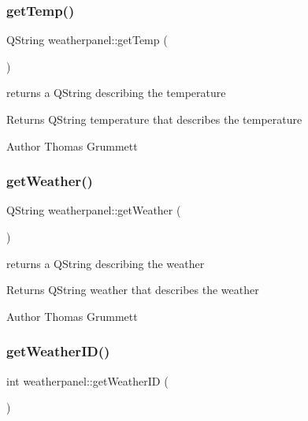 \subsubsection{\texorpdfstring{get\+Temp()}{getTemp()}}
{\footnotesize\ttfamily Q\+String weatherpanel\+::get\+Temp (\begin{DoxyParamCaption}{ }\end{DoxyParamCaption})}



returns a Q\+String describing the temperature 

\begin{DoxyReturn}{Returns}
Q\+String temperature that describes the temperature 
\end{DoxyReturn}
\begin{DoxyAuthor}{Author}
Thomas Grummett 
\end{DoxyAuthor}
\mbox{\label{classweatherpanel_af8d593a8bc328ea0614f9bfb3ddf4f08}} 
\subsubsection{\texorpdfstring{get\+Weather()}{getWeather()}}
{\footnotesize\ttfamily Q\+String weatherpanel\+::get\+Weather (\begin{DoxyParamCaption}{ }\end{DoxyParamCaption})}



returns a Q\+String describing the weather 

\begin{DoxyReturn}{Returns}
Q\+String weather that describes the weather 
\end{DoxyReturn}
\begin{DoxyAuthor}{Author}
Thomas Grummett 
\end{DoxyAuthor}
\mbox{\label{classweatherpanel_a45e1d05896ce57be8a2485f7559c4276}} 
\subsubsection{\texorpdfstring{get\+Weather\+I\+D()}{getWeatherID()}}
{\footnotesize\ttfamily int weatherpanel\+::get\+Weather\+ID (\begin{DoxyParamCaption}{ }\end{DoxyParamCaption})}



